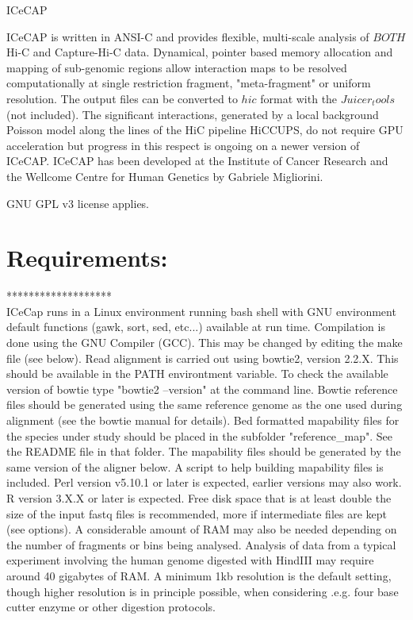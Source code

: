 \documentclass[10pt,a4paper]{article}
\begin{document}
\hspace*{1cm} 
{\huge ICeCAP} 
\vspace*{2cm}

ICeCAP is written in ANSI-C and provides flexible, multi-scale analysis of $BOTH$ Hi-C and Capture-Hi-C data. Dynamical, pointer based memory allocation and mapping of sub-genomic regions allow interaction maps to be resolved computationally at single restriction fragment, "meta-fragment" or uniform resolution.
The output files can be converted to $hic$ format with the $Juicer_tools$ (not included).
The significant interactions, generated by a local background Poisson model along the lines of the HiC pipeline HiCCUPS, do not require GPU acceleration but progress in this respect is ongoing on a newer version of ICeCAP.
ICeCAP has been developed at the Institute of Cancer Research and the Wellcome Centre for Human Genetics by Gabriele Migliorini.

GNU GPL v3 license applies.\\

\section*{Requirements:}
*******************\\
ICeCap runs in a Linux environment running bash shell with GNU environment default functions (gawk, sort, sed, etc...) available at run time.
Compilation is done using the GNU Compiler (GCC).  This may be changed by editing the make file (see below).
Read alignment is carried out using bowtie2, version 2.2.X.  This should be available in the PATH environtment variable.  To check the available version of bowtie type "bowtie2 --version" at the command line.
Bowtie reference files should be generated using the same reference genome as the one used during alignment (see the bowtie manual for details).
Bed formatted mapability files for the species under study should be placed in the subfolder "reference\_map". See the README file in that folder.
The mapability files should be generated by the same version of the aligner below. A script to help building mapability files is included.
Perl version v5.10.1 or later is expected, earlier versions may also work.
R version 3.X.X or later is expected.
Free disk space that is at least double the size of the input fastq files is recommended, more if intermediate files are kept (see options).
A considerable amount of RAM may also be needed depending on the number of fragments or bins being analysed.  Analysis of data from a typical experiment involving the human genome digested with HindIII may require around 40 gigabytes of RAM. A minimum 1kb resolution is the default setting, though higher resolution is in principle possible, when considering .e.g. four base cutter enzyme or other digestion protocols.
\end{document}
